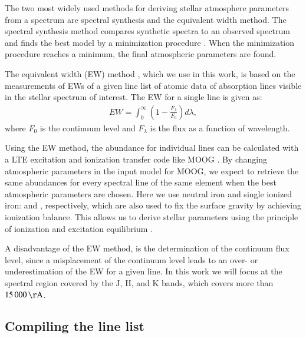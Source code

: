 \documentclass{aa}
\begin{document}
The two most widely used methods for deriving stellar atmosphere
parameters from a spectrum are spectral synthesis and the equivalent
width method. The spectral synthesis method compares synthetic spectra
to an observed spectrum and finds the best model by a minimization
procedure \citep[see e.g.][]{Valenti2005,Onehag2012,Blanco2014}. When
the minimization procedure reaches a minimum, the final atmospheric
parameters are found.

The equivalent width (EW) method
\citep{Sousa2008a,Bensby2014,Mucciarelli2013}, which we use in this
work, is based on the measurements of EWs of a given line list of atomic
data of absorption lines visible in the stellar spectrum of interest.
The EW for a single line is given as:
\begin{align}
    \label{eq:EW}
    EW = \int_0^\infty \left(1 - \frac{F_\lambda}{F_0}\right) d\lambda,
\end{align}
where $F_0$ is the continuum level and $F_\lambda$ is the flux as a
function of wavelength.

Using the EW method, the abundance for individual lines can be
calculated with a LTE excitation and ionization transfer code like
MOOG \citep{Sneden1973}. By changing
atmospheric parameters in the input model for MOOG, we expect to
retrieve the same abundances for every spectral line of the same
element when the best atmospheric parameters are chosen. Here we use
neutral iron and single ionized iron:  and ,
respectively, which are also used to fix the surface gravity by
achieving ionization balance. This allows us to derive stellar
parameters using the principle of ionization and excitation equilibrium
\citep{Gray2006}.

A disadvantage of the EW method, is the determination of the continuum
flux level, since a misplacement of the continuum level leads to an
over- or underestimation of the EW for a given line. In this work we
will focus at the spectral region covered by the J, H, and K bands,
which covers more than $\SI{15000}{\AA}$.



\subsection{Compiling the line list}
\end{document}
